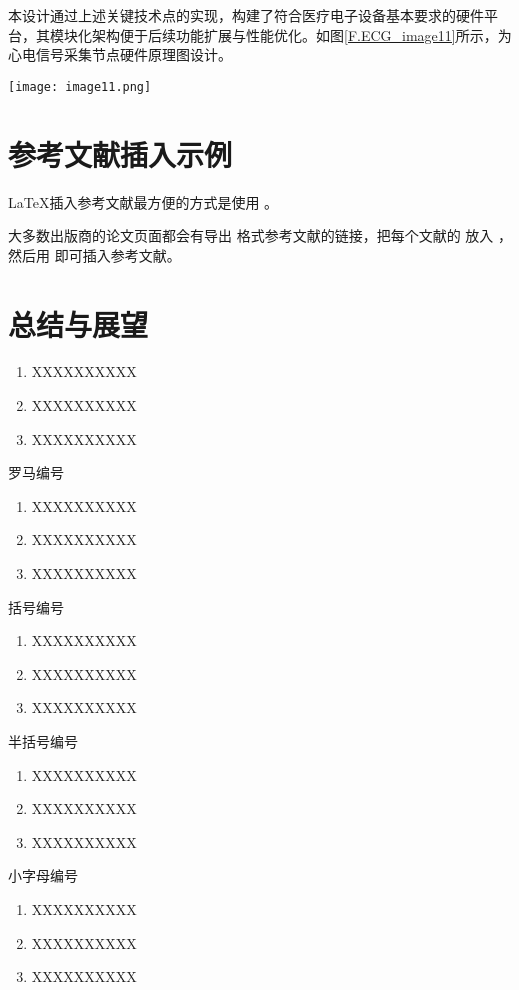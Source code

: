 本设计通过上述关键技术点的实现，构建了符合医疗电子设备基本要求的硬件平台，其模块化架构便于后续功能扩展与性能优化。如图\ref{F.ECG_image11}所示，为心电信号采集节点硬件原理图设计。

\begin{sidewaysfigure}
    \centering
    \texttt{[image: image11.png]}
    \caption{心电信号采集节点硬件原理图设计}
    \label{F.ECG_image11}
\end{sidewaysfigure}



\newpage    %

\section{参考文献插入示例}

\LaTeX \cite{lamport1994latex}插入参考文献最方便的方式是使用 \cite{pritchard1969statistical}。

大多数出版商的论文页面都会有导出  格式参考文献的链接，把每个文献的  放入 ，然后用  即可插入参考文献。


\newpage    %


\section{总结与展望}

\begin{enumerate}
 \item XXXXXXXXXX
 \label{item1}
 \item XXXXXXXXXX
 \item XXXXXXXXXX
\end{enumerate}
罗马编号
\begin{enumerate}[label=(\roman*)]
 \item XXXXXXXXXX
 \label{item2}
 \item XXXXXXXXXX
 \item XXXXXXXXXX
\end{enumerate}
括号编号
\begin{enumerate}[label=(\arabic*)]
 \item XXXXXXXXXX
 \label{item3}
 \item XXXXXXXXXX
 \item XXXXXXXXXX
\end{enumerate}
半括号编号
\begin{enumerate}[label=\arabic*)]
 \item XXXXXXXXXX
 \label{item4}
 \item XXXXXXXXXX
 \item XXXXXXXXXX
\end{enumerate}
小字母编号
\begin{enumerate}[label=\alph*)]
 \item XXXXXXXXXX
 \label{item5}
 \item XXXXXXXXXX
 \item XXXXXXXXXX
\end{enumerate}

